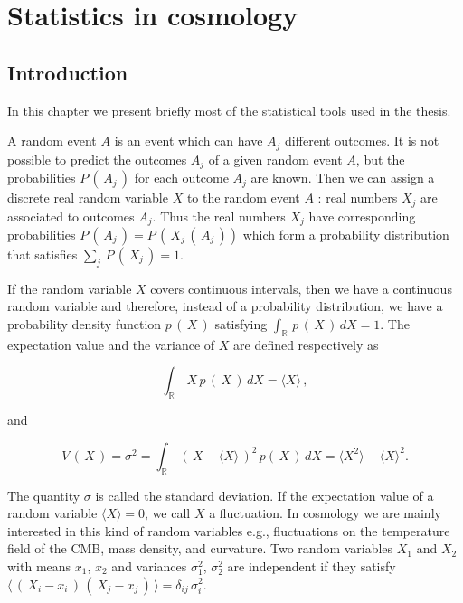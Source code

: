 \chapter{Statistics in cosmology}
\label{chapter:4}

\section{Introduction}

In this chapter we present briefly most of the statistical tools used in the thesis. 

A random event $ A $ is an event which can have $ A_j $ different outcomes. It is not possible to predict the outcomes $ A_j $ of a given random event $ A $, but the probabilities $ P\,(\,A_j\,) $ for each outcome $ A_j $ are known. Then we can assign a discrete real random variable $ X $ to the random event $ A $ : real numbers $ X_j $ are associated to  outcomes $ A_j $.  Thus the real numbers $ X_j $ have corresponding probabilities $ P\, (\,A_j\,) = P\,(\,X_j\,(\,A_j\,)) $ which form a probability distribution that satisfies $ \sum_j \,P\,(\,X_j\,) = 1 $.  

If the random variable $ X $ covers continuous intervals, then we have a continuous random variable and therefore, instead of a probability distribution, we have a probability density function $ p\,(\,X\,) $ satisfying $ \int_{\mathbb{R}} \,p\,(\,X\,)\, dX = 1 $. The expectation value and the variance of $ X $ are defined respectively as 

\begin{equation}
\int_{\mathbb{R}} \,X\, p\,(\,X\,)\, dX = \langle X \rangle\,,
\end{equation}

and

\begin{equation}
V\,(\,X\,) = \sigma^2 = \int_{\mathbb{R}} \, \left(\, X - \langle X \rangle \,\right)^2 \,p(\,X\,) \,dX = \langle X^2 \rangle - \langle X \rangle^2. 
\end{equation}

The quantity $ \sigma $ is called the standard deviation. If the expectation value of a random variable $ \langle X \rangle = 0 $, we call $ X $ a fluctuation. In cosmology we are mainly interested in this kind of random variables e.g., fluctuations on the temperature field of the CMB, mass density, and curvature. Two random variables $ X_1 $ and $ X_2 $ with means $ x_1 $, $ x_2 $ and variances $ \sigma_1^2 $, $ \sigma_2^2 $ are independent if they satisfy $ \langle \,(\, X_i - x_i \,)\, (\, X_j - x_j \,)\, \rangle  = \delta_{ij} \, \sigma_i^2$.

